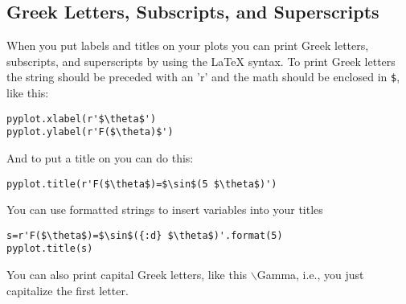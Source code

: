 \subsection*{Greek Letters, Subscripts, and Superscripts}


  When you put
labels and titles on your plots you can print Greek letters,
subscripts, and superscripts by using the LaTeX syntax. To print
Greek letters the string should be preceded with an 'r' and the math
should be enclosed in \texttt{\$}, like
this:
\begin{Verbatim}
pyplot.xlabel(r'$\theta$')
pyplot.ylabel(r'F($\theta)$')
\end{Verbatim}
And to put a title on you can do this:
\begin{Verbatim}
pyplot.title(r'F($\theta$)=$\sin$(5 $\theta$)')
\end{Verbatim}
You can use formatted strings to insert variables into your titles
\begin{Verbatim}
s=r'F($\theta$)=$\sin$({:d} $\theta$)'.format(5)
pyplot.title(s)
\end{Verbatim}
 
You can also print capital Greek letters, like this
$\backslash$Gamma, i.e., you just capitalize the first letter.

